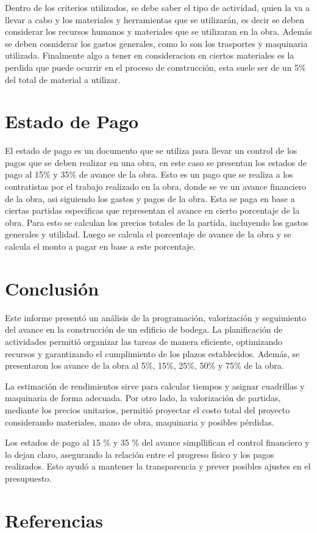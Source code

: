 \documentclass{article} %
\begin{document}
Dentro de los criterios utilizados, se debe saber el tipo de actividad, quien la va a llevar a cabo y los materiales y herramientas que se utilizarán, es decir se deben considerar los recursos humanos y materiales que se utilizaran en la obra. Además se deben cosniderar los gastos generales, como lo son los trasportes y maquinaria utilizada. Finalmente algo a tener en consideracion en ciertos materiales es la perdida que puede ocurrir en el proceso de construcción, esta suele ser de un 5\% del total de material a utilizar.

\newpage
\section{Estado de Pago}

El estado de pago es un documento que se utiliza para llevar un control de los pagos que se deben realizar en una obra, en este caso se presentan los estados de pago al 15\% y 35\% de avance de la obra. Esto es un pago que se realiza a los contratistas por el trabajo realizado en la obra, donde se ve un avance financiero de la obra, asi siguiendo los gastos y pagos de la obra. Esta se paga en base a ciertas partidas especificas que representan el avance en cierto porcentaje de la obra. Para esto se calculan los precios totales de la partida, incluyendo los gastos generales y utilidad. Luego se calcula el porcentaje de avance de la obra y se calcula el monto a pagar en base a este porcentaje.

\newpage
\section{Conclusión}

Este informe presentó un análisis de la programación, valorización y seguimiento del avance en la construcción de un edificio de bodega. La planificación de actividades permitió organizar las tareas de manera eficiente, optimizando recursos y garantizando el cumplimiento de los plazos establecidos. Además, se presentaron los avance de la obra al 5\%, 15\%, 25\%, 50\% y 75\% de la obra.

La estimación de rendimientos sirve para calcular tiempos y asignar cuadrillas y maquinaria de forma adecuada. Por otro lado, la valorización de partidas, mediante los precios unitarios, permitió proyectar el costo total del proyecto considerando materiales, mano de obra, maquinaria y posibles pérdidas.

Los estados de pago al 15 \% y 35 \% del avance simpllifican el control financiero y lo dejan claro, asegurando la relación entre el progreso físico y los pagos realizados. Esto ayudó a mantener la transparencia y prever posibles ajustes en el presupuesto.

\newpage
\section{Referencias}
\nocite{*}

  
\end{document}

